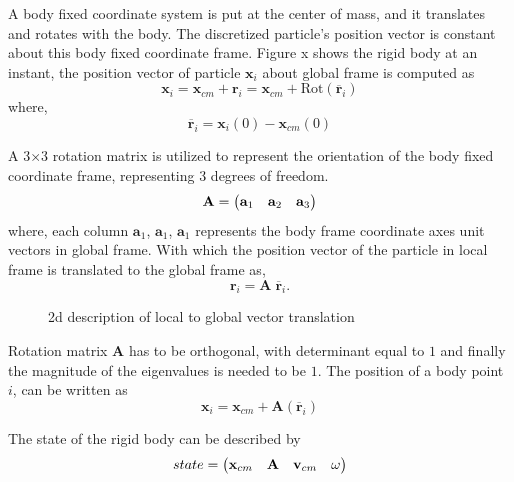 \documentclass[preprint,12pt]{elsarticle}
\newcommand{\ten}[1]{\ensuremath{\mathbf{#1}}}
\begin{document}
A body fixed coordinate system is put at the center of mass, and it translates
and rotates with the body. The discretized particle's position vector is
constant about this body fixed coordinate frame. Figure x shows the rigid body
at an instant, the position vector of particle $\ten{x}_i$ about global frame
is computed as
\begin{equation}
  \label{eq:global_position_vector_idea}
  \ten{x}_{i} = \ten{x}_{cm} + \ten{r}_i = \ten{x}_{cm} + \text{Rot}(\overline{\ten{r}}_i)
\end{equation}
where,
\begin{equation}
  \label{eq:body_position_vector}
  \overline{\ten{r}}_i = \ten{x}_i(0) - \ten{x}_{cm}(0)
\end{equation}

A 3$\times$3 rotation matrix is utilized to represent the orientation of the
body fixed coordinate frame, representing 3 degrees of freedom.
\begin{equation}
  \label{eq:rotation_matrix}
  \ten{A} = \mqty(\ten{a}_{1} & \ten{a}_{2} & \ten{a}_{3})
\end{equation}
where, each column $\ten{a}_{1}$, $\ten{a}_{1}$, $\ten{a}_{1}$ represents the
body frame coordinate axes unit vectors in global frame. With which the
position vector of the particle in local frame is translated to the global frame as,
\begin{equation}
  \label{eq:local_to_gloabl_translate}
  \ten{r}_i = \ten{A} \; \overline{\ten{r}}_i.
\end{equation}

\begin{figure}[!htpb]
  \centering
  \caption{2d description of local to global vector translation}
\label{fig:local_to_global_2d_explanation}
\end{figure}
Rotation matrix $\ten{A}$ has to be orthogonal, with determinant equal to $1$
and finally the magnitude of the eigenvalues is needed to be $1$. The position
of a body point $i$, can be written as
\begin{equation}
  \label{eq:global_position_vector}
  \ten{x}_{i} = \ten{x}_{cm} + \ten{A}(\overline{\ten{r}}_i)
\end{equation}

The state of the rigid body can be described by
\begin{equation}
  \label{eq:rotation_matrix}
  state = \mqty(\ten{x}_{cm} & \ten{A} & \ten{v}_{cm} & \ten{\omega})
\end{equation}
\newpage
~\newpage
\end{document}
